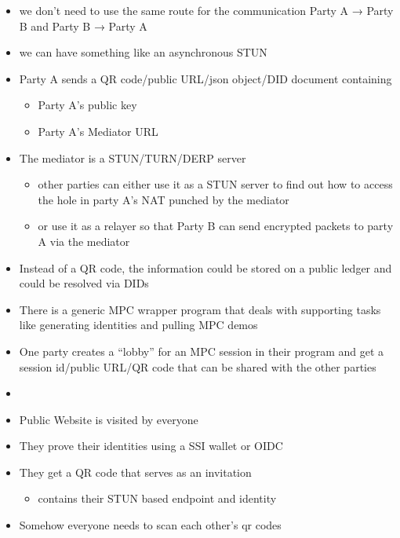 \begin{frame}
\begin{itemize}
\tightlist
\item
  we don't need to use the same route for the communication Party A →
  Party B and Party B → Party A
\item
  we can have something like an asynchronous STUN
\item
  Party A sends a QR code/public URL/json object/DID document containing

  \begin{itemize}
  \tightlist
  \item
    Party A's public key
  \item
    Party A's Mediator URL
  \end{itemize}
\item
  The mediator is a STUN/TURN/DERP server

  \begin{itemize}
  \tightlist
  \item
    other parties can either use it as a STUN server to find out how to
    access the hole in party A's NAT punched by the mediator
  \item
    or use it as a relayer so that Party B can send encrypted packets to
    party A via the mediator
  \end{itemize}
\item
  Instead of a QR code, the information could be stored on a public
  ledger and could be resolved via DIDs
\end{itemize}
\end{frame}

\begin{frame}
\begin{itemize}
\tightlist
\item
  There is a generic MPC wrapper program that deals with supporting
  tasks like generating identities and pulling MPC demos
\item
  One party creates a ``lobby'' for an MPC session in their program and
  get a session id/public URL/QR code that can be shared with the other
  parties
\item
\end{itemize}
\end{frame}

\begin{frame}
\begin{itemize}
\tightlist
\item
  Public Website is visited by everyone
\item
  They prove their identities using a SSI wallet or OIDC
\item
  They get a QR code that serves as an invitation

  \begin{itemize}
  \tightlist
  \item
    contains their STUN based endpoint and identity
  \end{itemize}
\item
  Somehow everyone needs to scan each other's qr codes
\end{itemize}
\end{frame}

